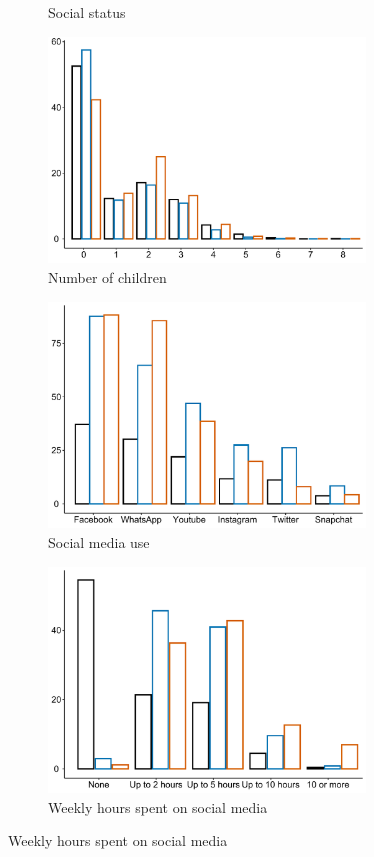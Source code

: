 \documentclass[12pt]{article}
\begin{document}
\begin{figure}[H]
\begin{subfigure}[b]{0.48\linewidth}
    \caption{Social status} 
    \label{} 
  \end{subfigure} 
  \hspace{\fill}
  \begin{subfigure}[b]{0.48\linewidth}
    \centering
    \includegraphics[height=6cm,width=8cm\linewidth]{Figures/AB/white/child.pdf} 
    \caption{Number of children} 
    \label{} 
  \end{subfigure} 

  \begin{subfigure}[b]{0.48\linewidth}
    \centering
    \includegraphics[height=6cm,width=8cm\linewidth]{Figures/AB/white/which_sm.pdf} 
    \caption{Social media use} 
    \label{} 
  \end{subfigure}
  \hspace{\fill}
  \begin{subfigure}[b]{0.48\linewidth}
    \centering
    \includegraphics[height=6cm,width=8cm\linewidth]{Figures/AB/white/hours_sm.pdf} 
    \caption{Weekly hours spent on social media} 
    \label{} 
  \end{subfigure} 

\end{figure}
\end{document}
